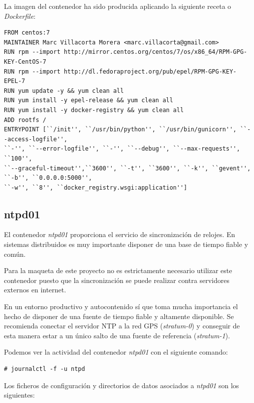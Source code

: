 \documentclass[a4paper,12pt,spanish,final]{epsc_tfc_pfc}
\begin{document}
La imagen del contenedor ha sido producida aplicando la siguiente receta o \emph{Dockerfile}:\\

\begin{lstlisting}[style=dnsmasq]
FROM centos:7
MAINTAINER Marc Villacorta Morera <marc.villacorta@gmail.com>
RUN rpm --import http://mirror.centos.org/centos/7/os/x86_64/RPM-GPG-KEY-CentOS-7
RUN rpm --import http://dl.fedoraproject.org/pub/epel/RPM-GPG-KEY-EPEL-7
RUN yum update -y && yum clean all
RUN yum install -y epel-release && yum clean all
RUN yum install -y docker-registry && yum clean all
ADD rootfs /
ENTRYPOINT [``/init'', ``/usr/bin/python'', ``/usr/bin/gunicorn'', ``--access-logfile'',
``-'', ``--error-logfile'', ``-'', ``--debug'', ``--max-requests'', ``100'',
``--graceful-timeout'',``3600'', ``-t'', ``3600'', ``-k'', ``gevent'', ``-b'', ``0.0.0.0:5000'',
``-w'', ``8'', ``docker_registry.wsgi:application'']
\end{lstlisting}

\subsection{ntpd01}

El contenedor \emph{ntpd01} proporciona el servicio de sincronización de relojes. En sistemas distribuidos es muy importante disponer de una base de tiempo fiable y común.

Para la maqueta de este proyecto no es estrictamente necesario utilizar este contenedor puesto que la sincronización se puede realizar contra servidores externos en internet.

En un entorno productivo y autocontenido sí que toma mucha importancia el hecho de disponer de una fuente de tiempo fiable y altamente disponible. Se recomienda conectar el servidor NTP a la red GPS (\emph{stratum-0}) y conseguir de esta manera estar a un único salto de una fuente de referencia (\emph{stratum-1}).

Podemos ver la actividad del contenedor \emph{ntpd01} con el siguiente comando:\\

\begin{lstlisting}[style=dnsmasq]
# journalctl -f -u ntpd
\end{lstlisting}

Los ficheros de configuración y directorios de datos asociados a \emph{ntpd01} son los siguientes:
\end{document}
